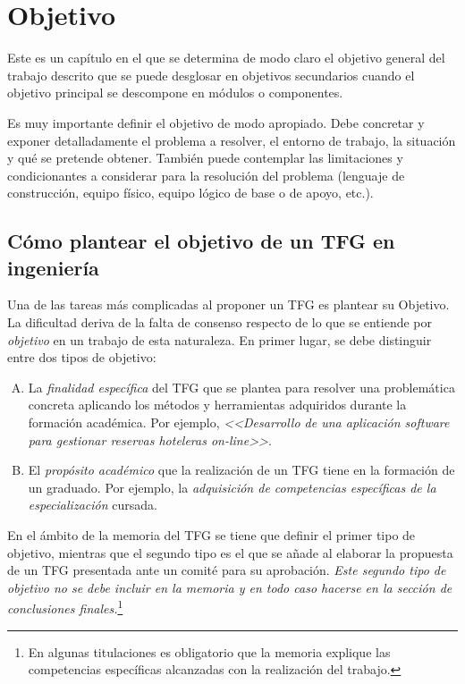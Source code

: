 \chapter{Objetivo}
\label{cap:Objetivo}
Este es un capítulo en el que se determina de modo claro el objetivo general del trabajo descrito que se puede desglosar en objetivos secundarios cuando el objetivo principal se descompone en módulos o componentes. 

Es muy importante definir el objetivo de modo apropiado. Debe concretar y exponer detalladamente el problema a resolver, el entorno de trabajo, la situación y qué se pretende obtener. También puede contemplar las limitaciones y condicionantes a considerar para la resolución del problema (lenguaje de construcción, equipo físico, equipo lógico de base o de apoyo, 
etc.).


\section{Cómo plantear el objetivo de un TFG en ingeniería}
Una de las tareas más complicadas al proponer un TFG es plantear su \textsf{Objetivo}. La dificultad deriva de la falta de consenso respecto de lo que se entiende por \emph{objetivo} en un trabajo de esta naturaleza. En primer lugar, se debe distinguir entre dos tipos de objetivo:


\begin{enumerate}[(A)]
	\item La \emph{finalidad específica} del TFG que se plantea para resolver una problemática concreta aplicando los métodos y herramientas adquiridos durante la formación académica. Por ejemplo, \emph{<<Desarrollo de una aplicación software para gestionar reservas hoteleras \emph{on-line}>>}.
	
	\item El \emph{propósito académico} que la realización de un TFG tiene en la formación de un graduado. Por ejemplo, la \emph{adquisición de competencias específicas de la especialización} cursada.
\end{enumerate}

En el ámbito de la memoria del TFG se tiene que definir el primer tipo de objetivo, mientras que el segundo tipo es el que se añade al elaborar la propuesta de un TFG presentada ante un comité para su aprobación. \emph{Este segundo tipo de objetivo no se debe incluir en la memoria y en todo caso hacerse en la sección de conclusiones finales.}\footnote{En algunas titulaciones es obligatorio que la memoria explique las competencias específicas alcanzadas con la realización del trabajo.}

